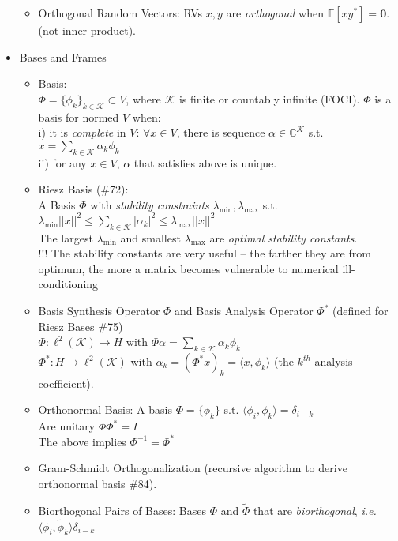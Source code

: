 \documentclass{article}
\newcommand{\ie}{\textit{i.e. }}
\newcommand{\la}{\langle}
\newcommand{\ra}{\rangle}
\begin{document}
\begin{itemize}
\begin{itemize}
	\item Orthogonal Random Vectors: RVs $x,y$ are \textit{orthogonal} when $\mathbb{E}[xy^{*}]=\mathbf{0}$. (not inner product).
	\end{itemize}
	\item Bases and Frames
	\begin{itemize}
		\item Basis: \\
		{\footnotesize\color{gray}
		$\Phi = \{\phi_k\}_{k\in\mathcal{K}} \subset V$, where $\mathcal{K}$ is finite or countably infinite (FOCI). $\Phi$ is a basis for normed $V$ when: \\
			i) it is \textit{complete} in $V$: $\forall x \in V$, there is sequence $\alpha \in \mathbb{C}^{\mathcal{K}}$ s.t. $x=\sum_{k\in\mathcal{K}}\alpha_k \phi_k$ \\
			ii) for any $x\in V$, $\alpha$ that satisfies above is unique.
		}
	\item Riesz Basis (\#72): \\
	{\color{gray} A Basis $\Phi$ with \textit{stability constraints} $\lambda_{\min}, \lambda_{\max}$ s.t. $\lambda_{\min}||x||^2 \le \sum_{k\in\mathcal{K}}|\alpha_k|^2\le \lambda_{\max}||x||^2$ \\
	The largest $\lambda_{\min}$ and smallest $\lambda_{\max}$ are \textit{optimal stability constants}. \\
	!!! The stability constants are very useful -- the farther they are from optimum, the more a matrix becomes vulnerable to numerical ill-conditioning
	}
	\item Basis Synthesis Operator $\Phi$ and Basis Analysis Operator $\Phi^{*}$ (defined for Riesz Bases \#75)\\
	{\footnotesize\color{gray} $\Phi: \ell^2(\mathcal{K})\rightarrow H$ with $\Phi\alpha = \sum_{k\in\mathcal{K}}\alpha_k\phi_k$ \\
	\footnotesize\color{gray} $\Phi^{*}: H \rightarrow \ell^2(\mathcal{K})$ with $\alpha_k = (\Phi^{*}x)_k = \la x, \phi_k \ra$ (the $k^{th}$ analysis coefficient).
 	}
 	\item Orthonormal Basis: A basis $\Phi=\{\phi_k\}$ s.t. $\la \phi_i, \phi_k \ra = \delta_{i-k}$ \\ 
 	{\footnotesize\color{gray} Are unitary $\Phi\Phi^{*}=I$ \\
 	The above implies $\Phi^{-1}=\Phi^{*}$}
 	\item Gram-Schmidt Orthogonalization (recursive algorithm to derive orthonormal basis \#84).
 	\item Biorthogonal Pairs of Bases: Bases $\Phi$ and $\tilde{\Phi}$ that are \textit{biorthogonal}, \ie $\la \phi_i, \tilde{\phi}_k\ra\delta_{i-k}$ \\

\end{itemize}
\end{itemize}
\end{document}
